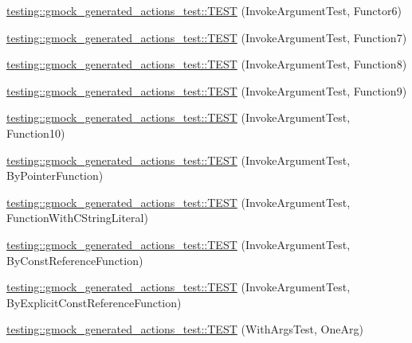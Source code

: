 \begin{DoxyCompactItemize}
\item 
\hyperlink{namespacetesting_1_1gmock__generated__actions__test_a789c7e8ee88243dc4a53841f6a8da3c6}{testing\+::gmock\+\_\+generated\+\_\+actions\+\_\+test\+::\+T\+E\+ST} (Invoke\+Argument\+Test, Functor6)
\item 
\hyperlink{namespacetesting_1_1gmock__generated__actions__test_a3e13c2ccf384c80c66116418e1b3ccde}{testing\+::gmock\+\_\+generated\+\_\+actions\+\_\+test\+::\+T\+E\+ST} (Invoke\+Argument\+Test, Function7)
\item 
\hyperlink{namespacetesting_1_1gmock__generated__actions__test_a5d583a32b46a306139d32ea9a1d575a9}{testing\+::gmock\+\_\+generated\+\_\+actions\+\_\+test\+::\+T\+E\+ST} (Invoke\+Argument\+Test, Function8)
\item 
\hyperlink{namespacetesting_1_1gmock__generated__actions__test_a3a278f02e1633feda3dea30d810a49ea}{testing\+::gmock\+\_\+generated\+\_\+actions\+\_\+test\+::\+T\+E\+ST} (Invoke\+Argument\+Test, Function9)
\item 
\hyperlink{namespacetesting_1_1gmock__generated__actions__test_afe4653b181e199417b004c4485152010}{testing\+::gmock\+\_\+generated\+\_\+actions\+\_\+test\+::\+T\+E\+ST} (Invoke\+Argument\+Test, Function10)
\item 
\hyperlink{namespacetesting_1_1gmock__generated__actions__test_ac3ff9db96cb7a664ef44d20eb0a7a71f}{testing\+::gmock\+\_\+generated\+\_\+actions\+\_\+test\+::\+T\+E\+ST} (Invoke\+Argument\+Test, By\+Pointer\+Function)
\item 
\hyperlink{namespacetesting_1_1gmock__generated__actions__test_a698f1a80b7fed18141fd170524908885}{testing\+::gmock\+\_\+generated\+\_\+actions\+\_\+test\+::\+T\+E\+ST} (Invoke\+Argument\+Test, Function\+With\+C\+String\+Literal)
\item 
\hyperlink{namespacetesting_1_1gmock__generated__actions__test_a82aff636cad2f441c584fc8e3c057d56}{testing\+::gmock\+\_\+generated\+\_\+actions\+\_\+test\+::\+T\+E\+ST} (Invoke\+Argument\+Test, By\+Const\+Reference\+Function)
\item 
\hyperlink{namespacetesting_1_1gmock__generated__actions__test_accb544431629bfb38a618343daaa54c2}{testing\+::gmock\+\_\+generated\+\_\+actions\+\_\+test\+::\+T\+E\+ST} (Invoke\+Argument\+Test, By\+Explicit\+Const\+Reference\+Function)
\item 
\hyperlink{namespacetesting_1_1gmock__generated__actions__test_ae6ef9e9d09c01cd0699a3044fd8c3f1f}{testing\+::gmock\+\_\+generated\+\_\+actions\+\_\+test\+::\+T\+E\+ST} (With\+Args\+Test, One\+Arg)
\item 

\end{DoxyCompactItemize}
